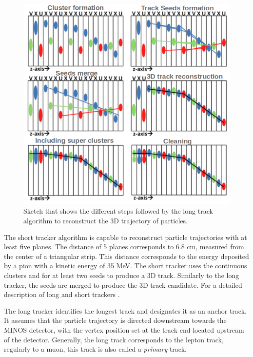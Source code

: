 \begin{figure}[!htb]
    \centering
    \includegraphics[scale=0.5]{Figures/Chapter2/LongTracking.png}
    \caption{Sketch that shows the different steps followed by the long track algorithm to reconstruct the 3D trajectory of particles.}\label{fig:MnvExp:MnvDetector:DataReconstruction:LongTrackreconstruction}
\end{figure}

The short tracker algorithm is capable to reconstruct particle trajectories with at least five planes. The distance of 5 planes corresponds to 6.8 cm, measured from the center of a triangular strip. This distance corresponds to the energy deposited by a pion with a kinetic energy of 35 MeV. The short tracker uses the continuous clusters and for at least two seeds to produce a 3D track. Similarly to the long tracker, the seeds are merged to produce the 3D track candidate. For a detailed description of long and short trackers \cite{AaronThesis}.

The long tracker identifies the longest track and designates it as an anchor track. It assumes that the particle trajectory is directed downstream towards the MINOS detector, with the vertex position set at the track end located upstream of the detector. Generally, the long track corresponds to the lepton track, regularly to a muon, this track is also called a \textit{primary} track.

